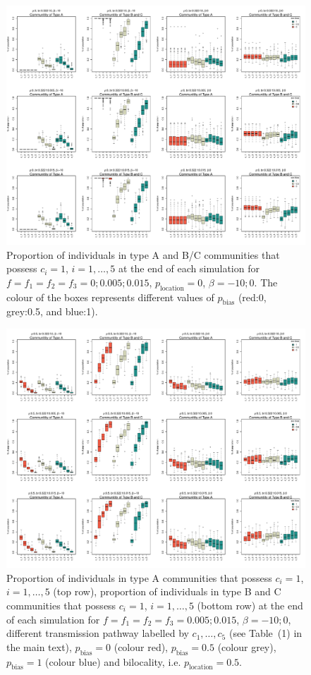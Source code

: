 \documentclass[9pt,twoside,lineno]{pnas-new}
\begin{document}
\begin{figure} %
    \centering
    \includegraphics[width=\textwidth]{FigsSM/All_PW_boxplot_poplevel_full_rho_0.pdf}
\caption{Proportion of individuals in type A and B/C communities that possess $c_i=1$, $i=1,\ldots,5$ at the end of each simulation for $f=f_1=f_2=f_3=0;0.005;0.015$, $p_\text{location}=0$, $\beta=-10;0$. The colour of the boxes represents different values of $p_\text{bias}$ (red:0, grey:0.5, and blue:1).}
\label{fig:S3}
\end{figure}

\begin{figure} %
    \centering
    \includegraphics[width=\textwidth]{FigsSM/All_PW_boxplot_poplevel_full_rho_0.5.pdf}
\caption{Proportion of individuals in type A communities that possess $c_i=1$, $i=1,\ldots,5$ (top row), proportion of individuals in type B and C communities that possess $c_i=1$, $i=1,\ldots,5$ (bottom row) at the end of each simulation for $f=f_1=f_2=f_3=0.005;0.015$, $\beta=-10;0$, different transmission pathway labelled by $c_1,\ldots,c_5$ (see Table~(1) in the main text), $p_\text{bias}=0$ (colour red), $p_\text{bias}=0.5$ (colour grey), $p_\text{bias}=1$ (colour blue) and bilocality, i.e. $p_\text{location}=0.5$.} %
    \label{fig:S4}
\end{figure}
\end{document}
